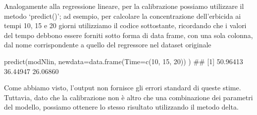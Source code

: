 \documentclass[a4paper,12pt,oneside]{book}
\newenvironment{Shaded}{}{}
\newcommand{\KeywordTok}[1]{#1}
\newcommand{\DataTypeTok}[1]{#1}
\newcommand{\DecValTok}[1]{#1}
\newcommand{\StringTok}[1]{#1}
\newcommand{\CommentTok}[1]{#1}
\newcommand{\NormalTok}[1]{#1}
\begin{document}
Analogamente alla regressione lineare, per la calibrazione possiamo utilizzare il metodo `predict()'; ad esempio, per calcolare la concentrazione dell'erbicida ai tempi 10, 15 e 20 giorni utilizziamo il codice sottostante, ricordando che i valori del tempo debbono essere forniti sotto forma di data frame, con una sola colonna, dal nome corrispondente a quello del regressore nel dataset originale

\begin{Shaded}
\begin{Highlighting}[]
\KeywordTok{predict}\NormalTok{(modNlin, }\DataTypeTok{newdata=}\KeywordTok{data.frame}\NormalTok{(}\DataTypeTok{Time=}\KeywordTok{c}\NormalTok{(}\DecValTok{10}\NormalTok{, }\DecValTok{15}\NormalTok{, }\DecValTok{20}\NormalTok{)) )}
\CommentTok{## [1] 50.96413 36.44947 26.06860}
\end{Highlighting}
\end{Shaded}

Come abbiamo visto, l'output non fornisce gli errori standard di queste stime. Tuttavia, dato che la calibrazione non è altro che una combinazione dei parametri del modello, possiamo ottenere lo stesso risultato utilizzando il metodo delta.

\begin{Shaded}
\end{Shaded}
\end{document}
